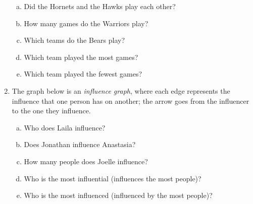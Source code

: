 \begin{enumerate}
\begin{center}
\end{center}
\begin{enumerate}[(a)]
\item Did the Hornets and the Hawks play each other?
\item How many games do the Warriors play?
\item Which teams do the Bears play?
\item Which team played the most games?
\item Which team played the fewest games?
\end{enumerate}

\item The graph below is an \emph{influence graph}, where each edge represents the influence that one person has on another; the arrow goes from the influencer to the one they influence.
\begin{center}
\end{center}
\begin{enumerate}[(a)]
\item Who does Laila influence?
\item Does Jonathan influence Anastasia?
\item How many people does Joelle influence?
\item Who is the most influential (influences the most people)?
\item Who is the most influenced (influenced by the most people)?
\end{enumerate}
\end{enumerate}

